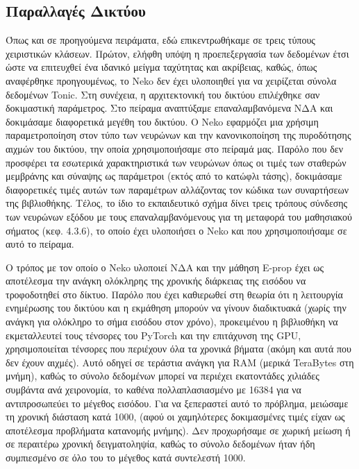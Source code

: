\documentclass[12pt]{report}
\begin{document}
\subsection{Παραλλαγές Δικτύου}

Όπως και σε προηγούμενα πειράματα, εδώ επικεντρωθήκαμε σε τρεις τύπους χειριστικών κλάσεων. Πρώτον, ελήφθη υπόψη η προεπεξεργασία των δεδομένων έτσι ώστε να επιτευχθεί ένα ιδανικό μείγμα ταχύτητας και ακρίβειας, καθώς, όπως αναφέρθηκε προηγουμένως, το \textlatin{Neko} δεν έχει υλοποιηθεί για να χειρίζεται σύνολα δεδομένων \textlatin{Tonic}. Στη συνέχεια, η αρχιτεκτονική του δικτύου επιλέχθηκε σαν δοκιμαστική παράμετρος. Στο πείραμα αναπτύξαμε επαναλαμβανόμενα ΝΔΑ και δοκιμάσαμε διαφορετικά μεγέθη του δικτύου. Ο \textlatin{Neko} εφαρμόζει μια χρήσιμη παραμετροποίηση στον τύπο των νευρώνων και την κανονικοποίηση της πυροδότησης αιχμών του δικτύου, την οποία χρησιμοποιήσαμε στο πείραμά μας. Παρόλο που δεν προσφέρει τα εσωτερικά χαρακτηριστικά των νευρώνων όπως οι τιμές των σταθερών μεμβράνης και σύναψης ως παράμετροι (εκτός από το κατώφλι τάσης), δοκιμάσαμε διαφορετικές τιμές αυτών των παραμέτρων αλλάζοντας τον κώδικα των συναρτήσεων της βιβλιοθήκης. Τέλος, το ίδιο το εκπαιδευτικό σχήμα δίνει τρεις τρόπους σύνδεσης των νευρώνων εξόδου με τους επαναλαμβανόμενους για τη μεταφορά του μαθησιακού σήματος (κεφ. 4.3.6), το οποίο έχει υλοποιήσει ο \textlatin{Neko} και που χρησιμοποιήσαμε σε αυτό το πείραμα.

Ο τρόπος με τον οποίο ο \textlatin{Neko} υλοποιεί ΝΔΑ και την μάθηση \textlatin{E-prop} έχει ως αποτέλεσμα την ανάγκη ολόκληρης της χρονικής διάρκειας της εισόδου να τροφοδοτηθεί στο δίκτυο. Παρόλο που έχει καθιερωθεί στη θεωρία ότι η λειτουργία ενημέρωσης του δικτύου και η εκμάθηση μπορούν να γίνουν διαδικτυακά (χωρίς την ανάγκη για ολόκληρο το σήμα εισόδου στον χρόνο), προκειμένου η βιβλιοθήκη να εκμεταλλευτεί τους τένσορες του \textlatin{PyTorch} και την επιτάχυνση της \textlatin{GPU}, χρησιμοποιείται τένσορες που περιέχουν όλα τα χρονικά βήματα (ακόμη και αυτά που δεν έχουν αιχμές). Αυτό οδηγεί σε τεράστια ανάγκη για \textlatin{RAM} (μερικά \textlatin{TeraBytes} στη μνήμη), καθώς το σύνολο δεδομένων μπορεί να περιέχει εκατοντάδες χιλιάδες συμβάντα ανά χειρονομία, το καθένα πολλαπλασιασμένο με 16384 για να αντιπροσωπεύει το μέγεθος εισόδου. Για να ξεπεραστεί αυτό το πρόβλημα, μειώσαμε τη χρονική διάσταση κατά 1000, (αφού οι χαμηλότερες δοκιμασμένες τιμές είχαν ως αποτέλεσμα προβλήματα κατανομής μνήμης). Δεν προχωρήσαμε σε χωρική μείωση ή σε περαιτέρω χρονική δειγματοληψία, καθώς το σύνολο δεδομένων ήταν ήδη συμπιεσμένο σε όλο του το μέγεθος κατά συντελεστή 1000.
\end{document}

